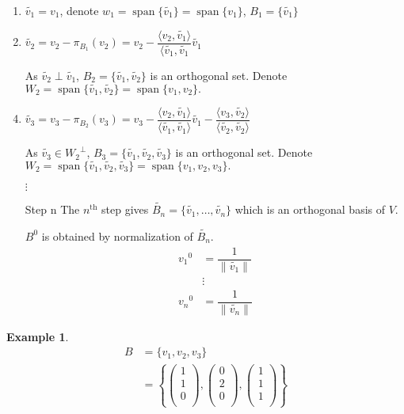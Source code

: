 \documentclass[fleqn, a4paper, 12pt]{article}
\DeclareMathOperator{\vspan}{\mathrm{span}} %
\theoremstyle{definition}
\newtheorem{example}{Example} %
\theoremstyle{theorem}
\theoremstyle{remark}
\numberwithin{corollary}{theorem}
\numberwithin{equation}{theorem}
\begin{document}
\begin{enumerate}[label=Step \arabic*]
	\item $\widetilde{v_1} = v_1$, denote $w_1 = \vspan\{\widetilde{v_1}\} = \vspan\{v_1\}$, $B_1 = \{\widetilde{v_1}\}$
	\item $\widetilde{v_2} = v_2 - \pi_{B_1}(v_2) = v_2 - \dfrac{\langle v_2, \widetilde{v_1}\rangle}{\langle \widetilde{v_1}, \widetilde{v_1}} \widetilde{v_1}$
	\item[] As $\widetilde{v_2} \perp \widetilde{v_1}$, $B_2 = \{\widetilde{v_1}, \widetilde{v_2}\}$ is an orthogonal set. Denote $W_2 = \vspan \{\widetilde{v_1}, \widetilde{v_2}\} = \vspan \{v_1, v_2\}.$
	\item $\widetilde{v_3} = v_3 - \pi_{B_2}(v_3) = v_3 - \dfrac{\langle v_2, \widetilde{v_1} \rangle}{\langle \widetilde{v_1}, \widetilde{v_1} \rangle} \widetilde{v_1} - \dfrac{\langle v_3, \widetilde{v_2} \rangle}{\langle \widetilde{v_2}, \widetilde{v_2} \rangle}$
	\item[] As $\widetilde{v_3} \in {W_2}^{\perp}$, $B_3 = \{\widetilde{v_1}, \widetilde{v_2}, \widetilde{v_3}\}$ is an orthogonal set. Denote $W_2 = \vspan \{\widetilde{v_1}, \widetilde{v_2}, \widetilde{v_3}\} = \vspan \{v_1, v_2, v_3\}.$
	\item[] $\vdots$
	\item[Step n] The $n^{\text{th}}$ step gives $\widetilde{B_n} = \{\widetilde{v_1}, \dots, \widetilde{v_n}\}$ which is an orthogonal basis of $V$.
	\item[] $B^0$ is obtained by normalization of $\widetilde{B_n}$.\\
		\begin{align*}
			{v_1}^0 &= \dfrac{1}{\|\widetilde{v_1}\|}\\
			&\vdots\\
			{v_n}^0 &= \dfrac{1}{\|\widetilde{v_n}\|}
		\end{align*}
\end{enumerate}

\begin{example}
	\begin{align*}
		B &= \{v_1, v_2, v_3\}\\
		&= 
			\left\lbrace
				\begin{pmatrix}
					1\\
					1\\
					0\\
				\end{pmatrix}
				,
				\begin{pmatrix}
					0\\
					2\\
					0\\
				\end{pmatrix}
				,
				\begin{pmatrix}
					1\\
					1\\
					1\\
				\end{pmatrix}
			\right\rbrace
	\end{align*}
\end{example}
\end{document}
